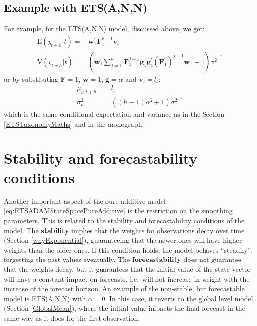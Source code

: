 \documentclass[]{book}
\theoremstyle{definition}
\theoremstyle{definition}
\theoremstyle{definition}
\theoremstyle{definition}
\theoremstyle{remark}
\begin{document}
\hypertarget{example-with-etsann}{%
\subsection{Example with ETS(A,N,N)}\label{example-with-etsann}}

For example, for the ETS(A,N,N) model, discussed above, we get:
\begin{equation}
  \begin{aligned}
    \text{E}(y_{t+h}|t) = & \mathbf{w}_{1}^\prime \mathbf{F}_{1}^{h-1} \mathbf{v}_{t} \\
    \text{V}(y_{t+h}|t) = & \left(\mathbf{w}_{1}^\prime \sum_{j=1}^{h-1} \mathbf{F}_{1}^{j-1} \mathbf{g}_{1} \mathbf{g}^\prime_{1} (\mathbf{F}_{1}^\prime)^{j-1} \mathbf{w}_{1} + 1 \right) \sigma^2
  \end{aligned},
  \label{eq:ETSADAMStateSpaceANNRecursionMeanAndVarianceGeneral}
\end{equation}
or by substituting \(\mathbf{F}=1\), \(\mathbf{w}=1\), \(\mathbf{g}=\alpha\) and \(\mathbf{v}_t=l_t\):
\begin{equation}
  \begin{aligned}
    \mu_{y,t+h} = & l_{t} \\
    \sigma^2_{h} = & \left((h-1) \alpha^2 + 1 \right) \sigma^2
  \end{aligned},
  \label{eq:ETSADAMStateSpaceANNRecursionMeanAndVariance}
\end{equation}
which is the same conditional expectation and variance as in the Section \ref{ETSTaxonomyMaths} and in the \citet{Hyndman2008b} monograph.

\hypertarget{stabilityConditionAdditiveError}{%
\section{Stability and forecastability conditions}\label{stabilityConditionAdditiveError}}

Another important aspect of the pure additive model \eqref{eq:ETSADAMStateSpacePureAdditive} is the restriction on the smoothing parameters. This is related to the stability and forecastability conditions of the model. The \textbf{stability} implies that the weights for observations decay over time (Section \ref{whyExponential}), guaranteeing that the newer ones will have higher weights than the older ones. If this condition holds, the model behaves ``steadily'', forgetting the past values eventually. The \textbf{forecastability} does not guarantee that the weights decay, but it guarantees that the initial value of the state vector will have a constant impact on forecasts, i.e.~will not increase in weight with the increase of the forecast horizon. An example of the non-stable, but forecastable model is ETS(A,N,N) with \(\alpha=0\). In this case, it reverts to the global level model (Section \ref{GlobalMean}), where the initial value impacts the final forecast in the same way as it does for the first observation.
\end{document}
